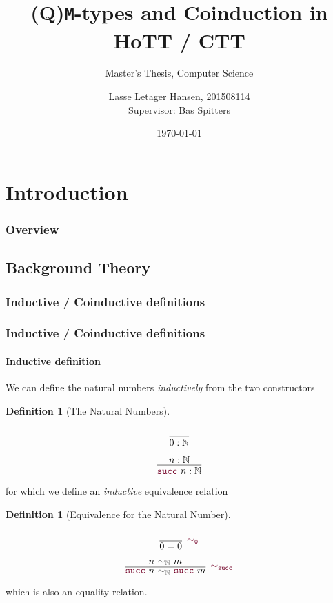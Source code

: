 \documentclass[xelatex,mathserif,serif,notheorems]{beamer} %
\title{(Q)\texttt{M}-types and Coinduction in HoTT / CTT}
\subtitle{Master's Thesis, Computer Science}
\author{\large Lasse Letager Hansen, 201508114\\[1ex]{\small Supervisor: Bas Spitters}}
\institute{Aarhus University}
\date{\today}
\theoremstyle{plain} %
\theoremstyle{definition}
\newtheorem{defn}[thm]{Definition}%
\theoremstyle{remark}
\newcommand*{\relation}[1]{\textcolor{gray!75!black}{\ensuremath{\mathtt{#1}}}}
\newcommand*{\constructor}[1]{\textcolor{purple!60!black}{\ensuremath{\mathtt{#1}}}}
\newcommand{\setlengths}{
  \setlength{\abovedisplayskip}{4pt}
  \setlength{\belowdisplayskip}{4pt}
  \setlength{\abovedisplayshortskip}{2pt}
  \setlength{\belowdisplayshortskip}{2pt}
}
\newcommand{\startwitheq}{\vspace{-2.5mm}} %
\begin{document}
\frame{\titlepage}

\section{Introduction}

\begin{frame}
  \frametitle{Overview}
  \tableofcontents[subsubsectionstyle=hide]
\end{frame}

\subsection{Background Theory}
\subsubsection{Inductive / Coinductive definitions}
\begin{frame}
  \frametitle{Inductive / Coinductive definitions}
  \framesubtitle{Inductive definition}
  We can define the natural numbers \emph{inductively} from the two constructors
  \begin{defn}[The Natural Numbers]\setlengths\startwitheq
    \strut
    \hfill
    \begin{minipage}{0.15\linewidth}
      \begin{equation}
        \vcenter{\infer{0 : \mathbb{N}}{\strut}}
      \end{equation}
    \end{minipage}
    \hfill
    \begin{minipage}{0.225\linewidth}
      \begin{equation}
        \vcenter{\infer{\constructor{succ}~n : \mathbb{N}}{n : \mathbb{N}}}
      \end{equation}
    \end{minipage}
    \hfill
    \strut
  \end{defn}
  for which we define an \emph{inductive} equivalence relation
  \begin{defn}[Equivalence for the Natural Number]\setlengths\startwitheq
    \strut
    \hfill
    \begin{minipage}{0.225\linewidth}
      \begin{equation}
        \vcenter{\infer[\constructor{\sim_{0}}]{0 = 0}{\strut}}
      \end{equation}
    \end{minipage}
    \hfill
    \begin{minipage}{0.45\linewidth}
      \begin{equation}
        \vcenter{\infer[\constructor{\sim_{succ}}]{\constructor{succ}~n~\relation{\sim_{\mathbb{N}}}~\constructor{succ}~m}{n~\relation{\sim_{\mathbb{N}}}~m}}
      \end{equation}
    \end{minipage}
    \hfill
    \strut
  \end{defn}
  which is also an equality relation.
\end{frame}
\end{document}
